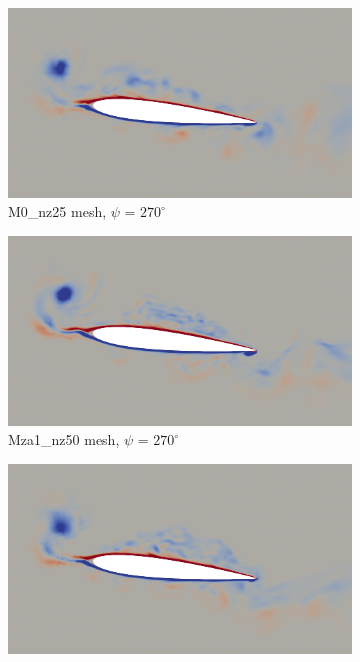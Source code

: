 \begin{figure}[H]
\centering

\begin{subfigure}[b]{0.475\textwidth}
\centering
\includegraphics[width=1\textwidth]{figures/adapt_strat/vorticity_plots/M0/phase_270.png}
\caption{M0\_nz25 mesh, $\psi$ = $270^\circ$}
\label{fig:M0_psi270}
\end{subfigure}
\begin{subfigure}[b]{0.475\textwidth}
\centering
\includegraphics[width=1\textwidth]{figures/adapt_strat/vorticity_plots/Mza1_50/phase_270.png}
\caption{Mza1\_nz50 mesh, $\psi$ = $270^\circ$}
\label{fig:Ma1_psi270}
\end{subfigure}
\begin{subfigure}[b]{0.475\textwidth}
\centering
\includegraphics[width=1\textwidth]{figures/adapt_strat/vorticity_plots/Msa1_50/phase_270.png}

\end{subfigure}
\end{figure}
